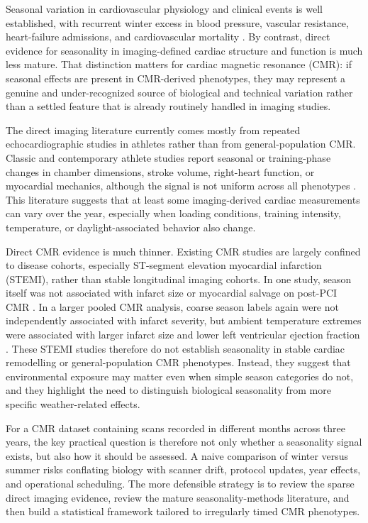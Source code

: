 Seasonal variation in cardiovascular physiology and clinical events is well established, with recurrent winter excess in blood pressure, vascular resistance, heart-failure admissions, and cardiovascular mortality \cite{Radke2010,Boulay1999,Gallerani2011,Bhatia2017,Mete2019}. By contrast, direct evidence for seasonality in imaging-defined cardiac structure and function is much less mature. That distinction matters for cardiac magnetic resonance (CMR): if seasonal effects are present in CMR-derived phenotypes, they may represent a genuine and under-recognized source of biological and technical variation rather than a settled feature that is already routinely handled in imaging studies.

The direct imaging literature currently comes mostly from repeated echocardiographic studies in athletes rather than from general-population CMR. Classic and contemporary athlete studies report seasonal or training-phase changes in chamber dimensions, stroke volume, right-heart function, or myocardial mechanics, although the signal is not uniform across all phenotypes \cite{Fagard1983,Crouse1992,Dernovoj2022,Forsythe2023}. This literature suggests that at least some imaging-derived cardiac measurements can vary over the year, especially when loading conditions, training intensity, temperature, or daylight-associated behavior also change.

Direct CMR evidence is much thinner. Existing CMR studies are largely confined to disease cohorts, especially ST-segment elevation myocardial infarction (STEMI), rather than stable longitudinal imaging cohorts. In one study, season itself was not associated with infarct size or myocardial salvage on post-PCI CMR \cite{Park2019}. In a larger pooled CMR analysis, coarse season labels again were not independently associated with infarct severity, but ambient temperature extremes were associated with larger infarct size and lower left ventricular ejection fraction \cite{Redfors2022}. These STEMI studies therefore do not establish seasonality in stable cardiac remodelling or general-population CMR phenotypes. Instead, they suggest that environmental exposure may matter even when simple season categories do not, and they highlight the need to distinguish biological seasonality from more specific weather-related effects.

For a CMR dataset containing scans recorded in different months across three years, the key practical question is therefore not only whether a seasonality signal exists, but also how it should be assessed. A naive comparison of winter versus summer risks conflating biology with scanner drift, protocol updates, year effects, and operational scheduling. The more defensible strategy is to review the sparse direct imaging evidence, review the mature seasonality-methods literature, and then build a statistical framework tailored to irregularly timed CMR phenotypes.

